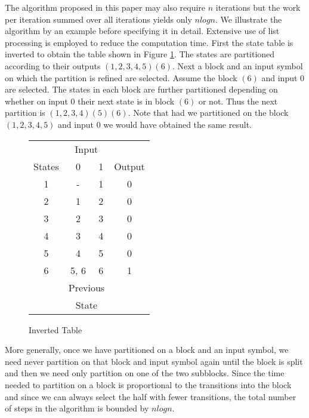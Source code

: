 The algorithm proposed in this paper may also require $n$ iterations but the work per iteration summed
over all iterations yields only $n log n$. We illustrate the algorithm by an example before specifying it in
detail. Extensive use of list processing is employed to reduce the computation time. First the state table
is inverted to obtain the table shown in Figure \ref{inverted02}.
The states are partitioned according to their outputs
$(1,2,3,4,5)(6)$. Next a block and an input symbol on which the partition is refined are selected. Assume
the block $(6)$ and input $0$ are selected. The states in each block are further partitioned depending on
whether on input $0$ their next state is in block $(6)$ or not. Thus the next partition is $(1,2,3,4)(5)(6)$.
Note that had we partitioned on the block $(1,2,3,4,5)$ and input $0$ we would have obtained the same result.

\begin{figure}[ht]
\caption{Inverted Table}
\label{inverted02}
\begin{center}
\begin{tabular}{c|cc|c}
       & \multicolumn{2}{|c|}{Input} &  \\
States & 0 & 1 & Output \\
\hline
1      & -    & 1 & 0      \\
2      & 1    & 2 & 0      \\
3      & 2    & 3 & 0      \\
4      & 3    & 4 & 0      \\
5      & 4    & 5 & 0      \\
6      & 5, 6 & 6 & 1      \\
\multicolumn{1}{c}{}  & \multicolumn{2}{c}{Previous}  & \multicolumn{1}{c}{} \\
\multicolumn{1}{c}{}  & \multicolumn{2}{c}{State} & \multicolumn{1}{c}{} \\
\end{tabular}
\end{center}
\end{figure}

More generally, once we have partitioned on a block
and an input symbol, we need never partition on that
block and input symbol again until the block is
split and then we need only partition on one of
the two subblocks. Since the time needed to
partition on a block is proportional to the
transitions into the block and since we can always
select the half with fewer transitions, the total
number of steps in the algorithm is bounded by
$n log n$.
